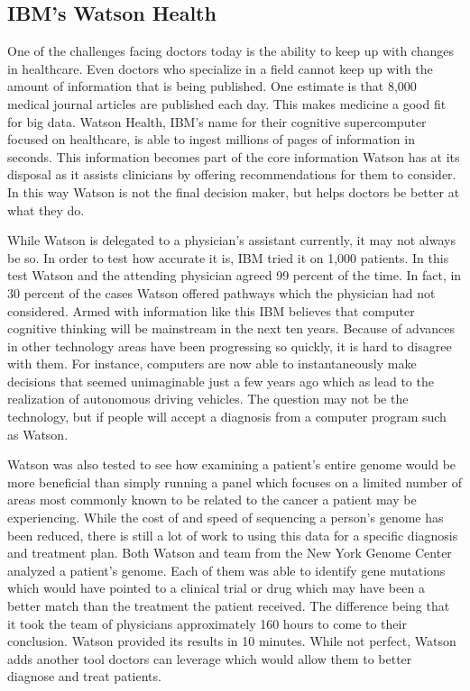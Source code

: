 \documentclass[sigconf]{acmart}
\begin{document}
\subsection{IBM's Watson Health}
One of the challenges facing doctors today is the ability to keep up with 
changes in healthcare.  Even doctors who specialize in a field cannot keep 
up with the amount of information that is being published.  One estimate is 
that 8,000 medical journal articles are published each 
day\cite{HealthCareITNews}.  This makes medicine a good fit for big data.  
Watson Health, IBM's name for their cognitive supercomputer focused on 
healthcare, is able to ingest millions of pages of information in seconds.  
This information becomes part of the core information Watson has at its 
disposal as it assists clinicians by offering recommendations for them to 
consider.  In this way Watson is not the final decision maker, but helps 
doctors be better at what they do\cite{PMC4287097}.    

While Watson is delegated to a physician's assistant currently, it may not 
always be so.  In order to test how accurate it is, IBM tried it on 1,000 
patients.  In this test Watson and the attending physician agreed 99 
percent of the time.  In fact, in 30 percent of the cases Watson offered 
pathways which the physician had not considered.  Armed with information 
like this IBM believes that computer cognitive thinking will be mainstream 
in the next ten years\cite{HealthCareITNews}.  Because of advances in other 
technology areas have been progressing so quickly, it is hard to disagree 
with them.  For instance, computers are now able to instantaneously make 
decisions that seemed unimaginable just a few years ago which as lead to 
the realization of autonomous driving vehicles.  The question may not be 
the technology, but if people will accept a diagnosis from a computer 
program such as Watson.

Watson was also tested to see how examining a patient's entire genome would 
be more beneficial than simply running a panel which focuses on a limited 
number of areas most commonly known to be related to the cancer a patient 
may be experiencing.  While the cost of and speed of sequencing a person's 
genome has been reduced, there is still a lot of work to using this data 
for a specific diagnosis and treatment plan. Both Watson and team from the 
New York Genome Center analyzed a patient's genome.  Each of them was able 
to identify gene mutations which would have pointed to a clinical trial or 
drug which may have been a better match than the treatment the patient 
received.  The difference being that it took the team of physicians 
approximately 160 hours to come to their conclusion.  Watson provided its 
results in 10 minutes\cite{IEEESpectrum}.  While not perfect, Watson adds 
another tool doctors can leverage which would allow them to better diagnose 
and treat patients.
\end{document}
